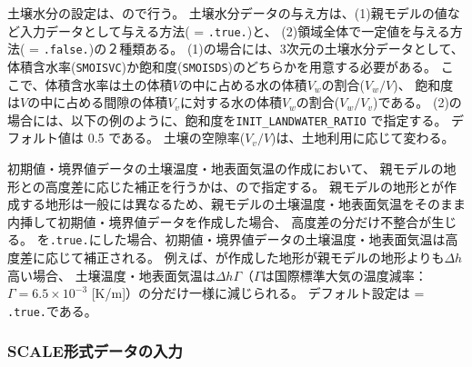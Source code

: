 土壌水分の設定は、ので行う。
土壌水分データの与え方は、(1)親モデルの値など入力データとして与える方法( = \verb|.true.|)と、
(2)領域全体で一定値を与える方法( = \verb|.false.|)の２種類ある。
(1)の場合には、3次元の土壌水分データとして、
体積含水率(\verb|SMOISVC|)か飽和度(\verb|SMOISDS|)のどちらかを用意する必要がある。
ここで、体積含水率は土の体積$V$の中に占める水の体積$V_w$の割合($V_w / V$)、
飽和度は$V$の中に占める間隙の体積$V_v$に対する水の体積$V_w$の割合($V_w / V_v$)である。
%
(2)の場合には、以下の例のように、飽和度を\verb|INIT_LANDWATER_RATIO| で指定する。
デフォルト値は 0.5 である。
土壌の空隙率($V_v/V$)は、土地利用に応じて変わる。

初期値・境界値データの土壌温度・地表面気温の作成において、
親モデルの地形との高度差に応じた補正を行うかは、ので指定する。
親モデルの地形と\scalerm が作成する地形は一般には異なるため、親モデルの土壌温度・地表面気温をそのまま内挿して初期値・境界値データを作成した場合、
高度差の分だけ不整合が生じる。
を\verb|.true.|にした場合、初期値・境界値データの土壌温度・地表面気温は高度差に応じて補正される。
例えば、\scalerm が作成した地形が親モデルの地形よりも$\Delta h$高い場合、
土壌温度・地表面気温は$\Delta h\Gamma$（$\Gamma$は国際標準大気の温度減率：$\Gamma=6.5\times 10^{-3}$ [K/m]）の分だけ一様に減じられる。
デフォルト設定は = \verb|.true.|である。


\subsubsection{SCALE形式データの入力} \label{sec:datainput_scale}

